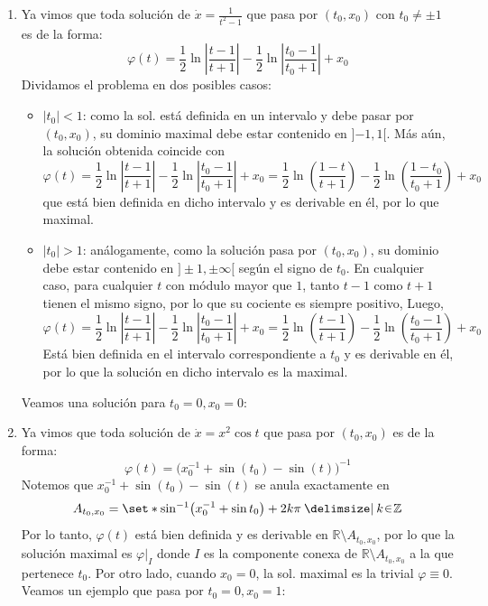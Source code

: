 \begin{sol}
\begin{enumerate}[label = (\alph*)]
\item 
Ya vimos que toda solución de $\dot{x} = \frac{1}{t^2-1}$ que pasa por $(t_0,x_0)$ con $t_0\neq \pm1$ es de la forma:
\[
\varphi(t)%
= \frac12\ln\left|%
    \frac{t - 1}{t + 1}%
\right| - \frac12\ln\left|%
    \frac{t_0 - 1}{t_0 + 1}%
\right| + x_0%
\]
Dividamos el problema en dos posibles casos:
    \begin{itemize}
    \item $|t_0| < 1$: como la sol. está definida en un intervalo y debe pasar por $(t_0, x_0)$, su dominio maximal debe estar contenido en ${]}{-1},1{[}$. Más aún, la solución obtenida coincide con
    \[
        \varphi(t)%
        = \frac12\ln\left|%
            \frac{t - 1}{t + 1}%
        \right| - \frac12\ln\left|%
            \frac{t_0 - 1}{t_0 + 1}%
        \right| + x_0%
        = \frac12\ln\left(%
            \frac{1-t}{t + 1}
        \right) - \frac12\ln\left(%
            \frac{1 - t_0}{t_0 + 1}%
        \right) + x_0
    \]
    que está bien definida en dicho intervalo y es derivable en él, por lo que maximal.
    
    \item $|t_0| > 1$: análogamente, como la solución pasa por $(t_0,x_0)$, su dominio debe estar contenido en ${]} \pm 1, \pm\infty{[}$ según el signo de $t_0$. En cualquier caso, para cualquier $t$ con módulo mayor que $1$, tanto $t - 1$ como $t + 1$ tienen el mismo signo, por lo que su cociente es siempre positivo, Luego,
    \[
        \varphi(t)%
        = \frac12\ln\left|%
            \frac{t - 1}{t + 1}%
        \right| - \frac12\ln\left|%
            \frac{t_0 - 1}{t_0 + 1}%
        \right| + x_0%
        = \frac12\ln\left(%
            \frac{t - 1}{t + 1}
        \right) - \frac12\ln\left(%
            \frac{t_0 - 1}{t_0 + 1}%
        \right) + x_0
    \]
    Está bien definida en el intervalo correspondiente a $t_0$ y es derivable en él, por lo que la solución en dicho intervalo es la maximal.
    \end{itemize}
Veamos una solución para $t_0=0,x_0=0$:


\item 
Ya vimos que toda solución de $\dot{x}=x^2\cos t$ que pasa por $(t_0,x_0)$ es de la forma:
\[
\varphi(t) = \big( x_0^{-1} + \sin(t_0) - \sin(t) \big)^{-1}
\]
Notemos que $x_0^{-1} + \sin(t_0) - \sin(t)$ se anula exactamente en 
\[
A_{t_0,x_0} = \set*{\sin^{-1}\!\big(x_0^{-1} + \sin t_0\big) + 2k\pi \given k \en \mathbb{Z}}
\]
Por lo tanto, $\varphi(t)$ está bien definida y es derivable en $\mathbb{R}\setminus A_{t_0,x_0}$, por lo que la solución maximal es $\varphi|_{I}$ donde $I$ es la componente conexa de $\mathbb{R}\setminus A_{t_0,x_0}$ a la que pertenece $t_0$. Por otro lado, cuando $x_0 = 0$, la sol. maximal es la trivial $\varphi \equiv 0$. Veamos un ejemplo que pasa por $t_0=0,x_0=1$:



\end{enumerate}
\end{sol}
